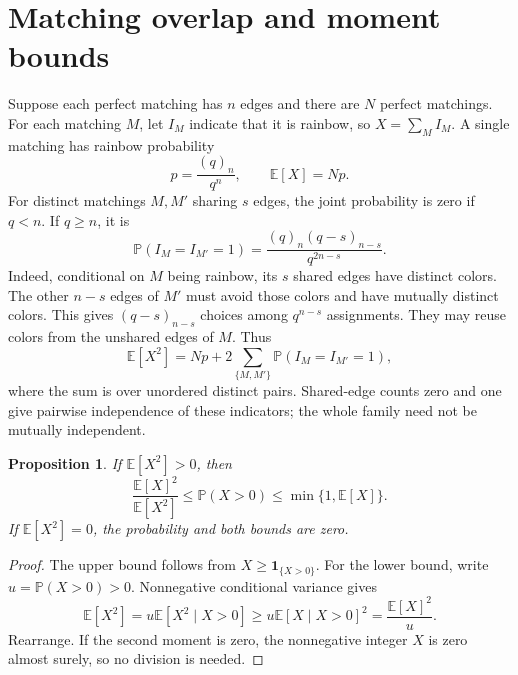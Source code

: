 \documentclass[10pt,letterpaper]{article}
\newtheorem{proposition}{Proposition}
\newcommand{\E}{\mathbb E}
\newcommand{\Prob}{\mathbb P}
\begin{document}
\section{Matching overlap and moment bounds}
Suppose each perfect matching has $n$ edges and there are $N$ perfect matchings.
For each matching $M$, let $I_M$ indicate that it is rainbow, so
$X=\sum_M I_M$. A single matching has rainbow probability
\[
 p=\frac{(q)_n}{q^n},\qquad \E[X]=Np.
\]
For distinct matchings $M,M'$ sharing $s$ edges, the joint probability is zero
if $q<n$. If $q\ge n$, it is
\begin{equation}\label{eq:joint}
 \Prob(I_M=I_{M'}=1)=\frac{(q)_n(q-s)_{n-s}}{q^{2n-s}}.
\end{equation}
Indeed, conditional on $M$ being rainbow, its $s$ shared edges have distinct
colors. The other $n-s$ edges of $M'$ must avoid those colors and have mutually
distinct colors. This gives $(q-s)_{n-s}$ choices among $q^{n-s}$ assignments.
They may reuse colors from the unshared edges of $M$. Thus
\[
 \E[X^2]=Np+2\sum_{\{M,M'\}}\Prob(I_M=I_{M'}=1),
\]
where the sum is over unordered distinct pairs. Shared-edge counts zero and
one give pairwise independence of these indicators; the whole family need
not be mutually independent.

\begin{proposition}\label{prop:bounds}
If $\E[X^2]>0$, then
\[
 \frac{\E[X]^2}{\E[X^2]}\le \Prob(X>0)\le\min\{1,\E[X]\}.
\]
If $\E[X^2]=0$, the probability and both bounds are zero.
\end{proposition}
\begin{proof}
The upper bound follows from $X\ge\mathbf1_{\{X>0\}}$. For the lower bound,
write $u=\Prob(X>0)>0$. Nonnegative conditional variance gives
\[
 \E[X^2]=u\E[X^2\mid X>0]
 \ge u\E[X\mid X>0]^2=\frac{\E[X]^2}{u}.
\]
Rearrange. If the second moment is zero, the nonnegative integer $X$ is zero
almost surely, so no division is needed.
\end{proof}
\end{document}
